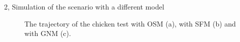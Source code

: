 \documentclass[10pt,a4paper]{article}
\begin{document}
\begin{task}{2, Simulation of the scenario with a different model}
\begin{figure}[H]
    \centering
    \hfill
    \hfill
    \caption{The trajectory of the chicken test with OSM (a), with SFM (b) and with GNM (c).}
    \label{fig:chicken-osm-sfm-gnm}
\end{figure}
\end{task}
\end{document}
